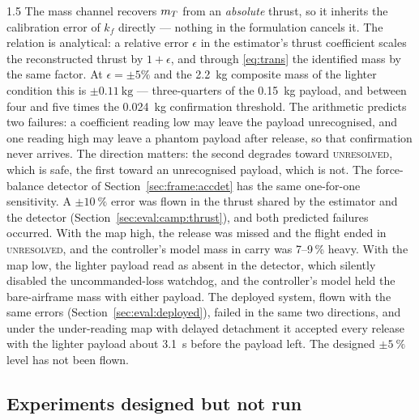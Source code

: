 \begin{spacing}{1.5}
The mass channel recovers $m_T$ from an \emph{absolute} thrust, so it inherits
the calibration error of $k_f$ directly --- nothing in the formulation cancels
it. The relation is analytical: a relative error $\epsilon$ in the estimator's
thrust coefficient scales the reconstructed thrust by $1+\epsilon$, and through
\eqref{eq:trans} the identified mass by the same factor. At $\epsilon=\pm5\%$ and
the \SI{2.2}{\kg} composite mass of the lighter condition this is
$\pm\SI{0.11}{\kg}$ --- three-quarters of the \SI{0.15}{\kg} payload, and
between four and five times the \SI{0.024}{\kg} confirmation threshold. The
arithmetic predicts two failures: a coefficient reading low may leave the
payload unrecognised, and one reading high may leave a phantom payload after
release, so that confirmation never arrives. The direction matters: the second
degrades toward \textsc{unresolved}, which is safe, the first toward an
unrecognised payload, which is not. The force-balance detector of
Section~\ref{sec:frame:accdet} has the same one-for-one sensitivity. A
$\pm\SI{10}{\percent}$ error was flown in the thrust shared by the estimator and
the detector (Section~\ref{sec:eval:camp:thrust}), and both predicted failures
occurred. With the map high, the release was missed and the flight ended in
\textsc{unresolved}, and the controller's model mass in carry was 7--9\,\% heavy.
With the map low, the lighter payload read as absent in the detector, which
silently disabled the uncommanded-loss watchdog, and the controller's model
held the bare-airframe mass with either payload. The deployed system,
flown with the same errors (Section~\ref{sec:eval:deployed}), failed in the same
two directions, and under the under-reading map with delayed detachment it
accepted every release with the lighter payload about \SI{3.1}{\second} before
the payload left. The designed $\pm\SI{5}{\percent}$ level has not been
flown.

\subsection{Experiments designed but not run}\label{sec:eval:notrun}\label{sec:eval:partial}\label{sec:eval:seed}


\end{spacing}
